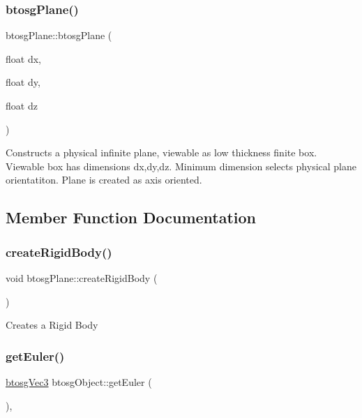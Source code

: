 \subsubsection{\texorpdfstring{btosg\+Plane()}{btosgPlane()}\hspace{0.1cm}{\footnotesize\ttfamily [3/3]}}
{\footnotesize\ttfamily btosg\+Plane\+::btosg\+Plane (\begin{DoxyParamCaption}\item[{float}]{dx,  }\item[{float}]{dy,  }\item[{float}]{dz }\end{DoxyParamCaption})\hspace{0.3cm}{\ttfamily [inline]}}

Constructs a physical infinite plane, viewable as low thickness finite box. Viewable box has dimensions dx,dy,dz. Minimum dimension selects physical plane orientatiton. Plane is created as axis oriented. 

\subsection{Member Function Documentation}
\mbox{\label{classbtosgPlane_a0e6812c186ed1fa128dccf7cd2e525a6}} 
\subsubsection{\texorpdfstring{create\+Rigid\+Body()}{createRigidBody()}}
{\footnotesize\ttfamily void btosg\+Plane\+::create\+Rigid\+Body (\begin{DoxyParamCaption}{ }\end{DoxyParamCaption})\hspace{0.3cm}{\ttfamily [inline]}}

Creates a Rigid Body \mbox{\label{classbtosgObject_a2019ec63bde02b72600450c7c985e77a}} 
\subsubsection{\texorpdfstring{get\+Euler()}{getEuler()}}
{\footnotesize\ttfamily \hyperlink{classbtosgVec3}{btosg\+Vec3} btosg\+Object\+::get\+Euler (\begin{DoxyParamCaption}{ }\end{DoxyParamCaption})\hspace{0.3cm}{\ttfamily [inline]}, {\ttfamily [inherited]}}

